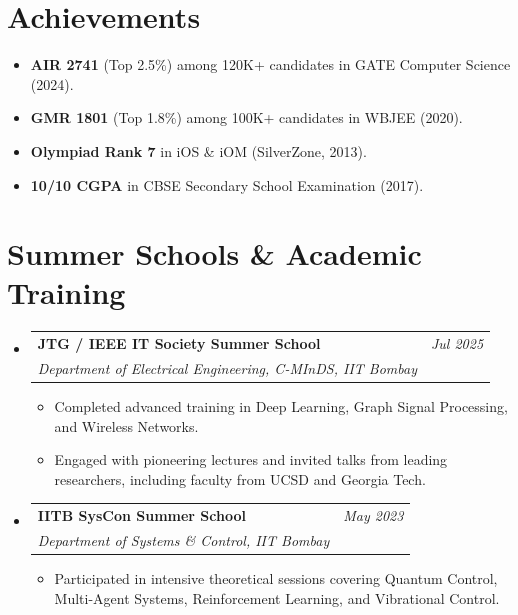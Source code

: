 \documentclass[a4paper,11pt]{article}
\makeatletter
\newcommand{\resumeProject}[4]{
\item
    \begin{tabular*}{0.98\textwidth}[t]{l@{\extracolsep{\fill}}r}
        \textbf{#1} & \textit{\footnotesize{#3}} \\
        \footnotesize{\textit{#2}} & \footnotesize{#4}
    \end{tabular*}
}
\newcommand{\resumeItem}[1]{\item #1}
\newcommand{\resumeListStart}{\begin{itemize}[leftmargin=*]}
\newcommand{\resumeListEnd}{\end{itemize}\vspace{-1mm}}
\makeatother
\begin{document}
\section*{Achievements}
\begin{itemize}[leftmargin=*]
  \resumeItem{\textbf{AIR 2741} (Top 2.5\%) among 120K+ candidates in GATE Computer Science (2024).}
  \resumeItem{\textbf{GMR 1801} (Top 1.8\%) among 100K+ candidates in WBJEE (2020).}
  \resumeItem{\textbf{Olympiad Rank 7} in iOS \& iOM (SilverZone, 2013).}
  \resumeItem{\textbf{10/10 CGPA} in CBSE Secondary School Examination (2017).}
\end{itemize}

\section*{Summer Schools \& Academic Training}
\begin{itemize}[leftmargin=*]
  \resumeProject{JTG / IEEE IT Society Summer School}{Department of Electrical Engineering, C-MInDS, IIT Bombay}{Jul 2025}{}
    \resumeListStart
      \resumeItem{Completed advanced training in Deep Learning, Graph Signal Processing, and Wireless Networks.}
      \resumeItem{Engaged with pioneering lectures and invited talks from leading researchers, including faculty from UCSD and Georgia Tech.}
    \resumeListEnd

  \resumeProject{IITB SysCon Summer School}{Department of Systems \& Control, IIT Bombay}{May 2023}{}
    \resumeListStart
      \resumeItem{Participated in intensive theoretical sessions covering Quantum Control, Multi-Agent Systems, Reinforcement Learning, and Vibrational Control.}
    \resumeListEnd
\end{itemize}
\end{document}
